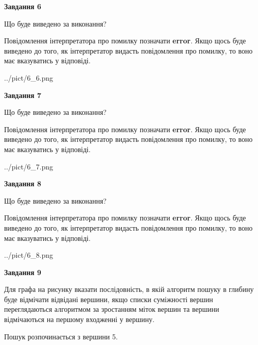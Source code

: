 \documentclass[12pt, ukrainian]{article}
\begin{document}
{\begin {large}
{\begin {center}\textbf{Завдання 6}\end {center}}\par
Що буде виведено за виконання?

Повідомлення інтерпретатора про помилку позначати \textbf{error}.
Якщо щось буде виведено до того, як інтерпретатор видасть повідомлення про помилку, 
то воно має вказуватись у відповіді. \par


\begin{center}
	{../pict/6_6.png}
\end{center}
\newpage

{\begin {center}\textbf{Завдання 7}\end {center}}\par
Що буде виведено за виконання?

Повідомлення інтерпретатора про помилку позначати \textbf{error}.
Якщо щось буде виведено до того, як інтерпретатор видасть повідомлення про помилку, 
то воно має вказуватись у відповіді. \par


\begin{center}
	{../pict/6_7.png}
\end{center}
\newpage

{\begin {center}\textbf{Завдання 8}\end {center}}\par
Що буде виведено за виконання?

Повідомлення інтерпретатора про помилку позначати \textbf{error}.
Якщо щось буде виведено до того, як інтерпретатор видасть повідомлення про помилку, 
то воно має вказуватись у відповіді. \par


\begin{center}
	{../pict/6_8.png}
\end{center}
\newpage

{\begin {center}\textbf{Завдання 9}\end {center}}\par
Для графа на рисунку вказати послідовність, в якій алгоритм пошуку в глибину буде відмічати відвідані вершини, якщо списки суміжності вершин переглядаються алгоритмом за зростанням міток вершин та вершини відмічаються на першому вход\-женні у вершину.\par
Пошук розпочинається з вершини 5.\par


\end{large}}
\end{document}
